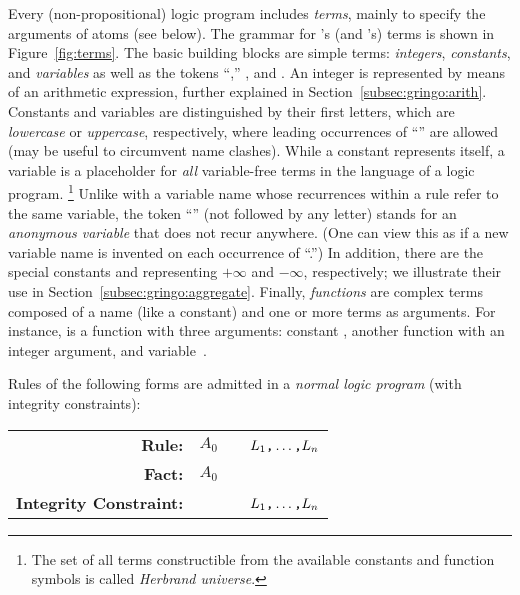 Every (non-propositional) logic program includes \emph{terms},
mainly to specify the arguments of atoms (see below).
The grammar for \gringo's (and \clingo's) terms is shown in Figure~\ref{fig:terms}.
The basic building blocks are simple terms:
\emph{integers}, \emph{constants}, and \emph{variables}
as well as the tokens ``,'' , and .
An integer is represented by means of an arithmetic expression,
further explained in Section~\ref{subsec:gringo:arith}.
Constants and variables are distinguished by their first letters, 
which are \emph{lowercase} or \emph{uppercase}, respectively,
where leading occurrences of ``'' are allowed
(may be useful to circumvent name clashes).
While a constant represents itself,
a variable is a placeholder for \emph{all} variable-free terms
in the language of a logic program.%
\footnote{The set of all terms constructible from the available
          constants and function symbols is called \emph{Herbrand universe}.}
Unlike with a variable name whose recurrences within a rule refer to the same variable,
the token ``'' (not followed by any letter)
stands for an \emph{anonymous variable} that does not recur anywhere. 
(One can view this as if a new variable name is invented on each
 occurrence of ``.'')
In addition, there are the special constants  and 
representing $+\infty$ and $-\infty$, respectively;
we illustrate their use in Section~\ref{subsec:gringo:aggregate}.
Finally, \emph{functions} are complex terms composed of a name (like a constant)
and one or more terms as arguments. %
For instance, 
is a function with three arguments:
constant , another function 
with an integer argument, and variable~.

Rules of the following forms are admitted in a 
\emph{normal logic program} (with integrity constraints): %

\begin{tabular}{rl@{}l}\label{eq:normal:rule}
\textbf{Rule:} & $A_0$&~\code{:-}~$L_1\text{\texttt{,}}\dots\text{\texttt{,}}L_n$\code{.}
\\
\textbf{Fact:} & $A_0$&\code{.}
\\
\textbf{Integrity Constraint:} & &~\code{:-}~$L_1\texttt{,}\dots\texttt{,}L_n$\code{.}
\end{tabular}
%
%
%
\newline

